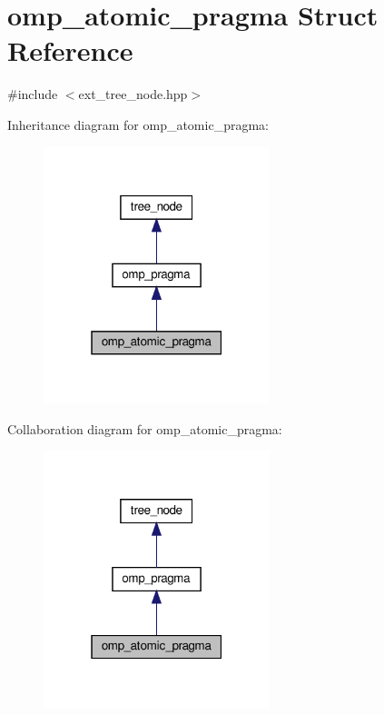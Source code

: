 \hypertarget{structomp__atomic__pragma}{}\section{omp\+\_\+atomic\+\_\+pragma Struct Reference}
\label{structomp__atomic__pragma}


{\ttfamily \#include $<$ext\+\_\+tree\+\_\+node.\+hpp$>$}



Inheritance diagram for omp\+\_\+atomic\+\_\+pragma\+:
\nopagebreak
\begin{figure}[H]
\begin{center}
\leavevmode
\includegraphics[width=187pt]{d5/d48/structomp__atomic__pragma__inherit__graph}
\end{center}
\end{figure}


Collaboration diagram for omp\+\_\+atomic\+\_\+pragma\+:
\nopagebreak
\begin{figure}[H]
\begin{center}
\leavevmode
\includegraphics[width=187pt]{de/ddc/structomp__atomic__pragma__coll__graph}
\end{center}
\end{figure}
